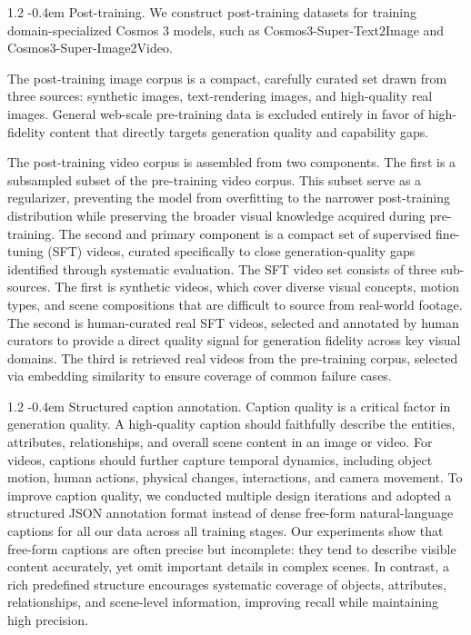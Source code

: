 \documentclass{llmxive}
\makeatletter
\providecommand{\paragraph}{  \@startsection{paragraph}{4}{\z@}    {1\baselineskip \@plus .2\baselineskip}    {-0.4em}    {\normalfont\normalsize\bfseries}}
\makeatother
\begin{document}
\paragraph{Post-training.} We construct post-training datasets for training domain-specialized Cosmos 3 models, such as Cosmos3-Super-Text2Image and Cosmos3-Super-Image2Video.

The post-training image corpus is a compact, carefully curated set drawn from three sources: synthetic images, text-rendering images, and high-quality real images. General web-scale pre-training data is excluded entirely in favor of high-fidelity content that directly targets generation quality and capability gaps.


The post-training video corpus is assembled from two components. The first is a subsampled subset of the pre-training video corpus.
This subset serve as a regularizer, preventing the model from overfitting to the narrower post-training distribution while preserving the broader visual knowledge acquired during pre-training. The second and primary component is a compact set of supervised fine-tuning (SFT) videos, curated specifically to close generation-quality gaps identified through systematic evaluation. The SFT video set consists of three sub-sources. The first is synthetic videos, which cover diverse visual concepts, motion types, and scene compositions that are difficult to source from real-world footage. The second is human-curated real SFT videos, selected and annotated by human curators to provide a direct quality signal for generation fidelity across key visual domains. The third is retrieved real videos from the pre-training corpus, selected via embedding similarity to ensure coverage of common failure cases.

\paragraph{Structured caption annotation.}
Caption quality is a critical factor in generation quality. A high-quality caption should faithfully describe the entities, attributes, relationships, and overall scene content in an image or video. For videos, captions should further capture temporal dynamics, including object motion, human actions, physical changes, interactions, and camera movement. To improve caption quality, we conducted multiple design iterations and adopted a structured JSON annotation format instead of dense free-form natural-language captions for all our data across all training stages. Our experiments show that free-form captions are often precise but incomplete: they tend to describe visible content accurately, yet omit important details in complex scenes. In contrast, a rich predefined structure encourages systematic coverage of objects, attributes, relationships, and scene-level information, improving recall while maintaining high precision.
\end{document}
